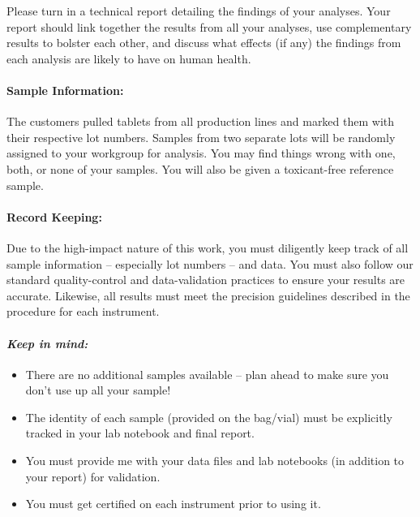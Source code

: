 \documentclass[]{tufte-book}
\providecommand{\tightlist}{%
  \setlength{\itemsep}{0pt}\setlength{\parskip}{0pt}}
\begin{document}
Please turn in a technical report detailing the findings of your analyses. Your report should link together the results from all your analyses, use complementary results to bolster each other, and discuss what effects (if any) the findings from each analysis are likely to have on human health.

\hypertarget{sample-information-1}{%
\paragraph{\texorpdfstring{\textbf{Sample Information:}}{Sample Information:}}\label{sample-information-1}}

The customers pulled tablets from all production lines and marked them with their respective lot numbers. Samples from two separate lots will be randomly assigned to your workgroup for analysis. You may find things wrong with one, both, or none of your samples. You will also be given a toxicant-free reference sample.

\hypertarget{record-keeping-1}{%
\paragraph{\texorpdfstring{\textbf{Record Keeping:}}{Record Keeping:}}\label{record-keeping-1}}

Due to the high-impact nature of this work, you must diligently keep track of all sample information -- especially lot numbers -- and data. You must also follow our standard quality-control and data-validation practices to ensure your results are accurate. Likewise, all results must meet the precision guidelines described in the procedure for each instrument.

\hypertarget{keep-in-mind-1}{%
\paragraph{\texorpdfstring{\emph{Keep in mind:}}{Keep in mind:}}\label{keep-in-mind-1}}

\begin{itemize}
\tightlist
\item
  There are no additional samples available -- plan ahead to make sure you don't use up all your sample!\\
\item
  The identity of each sample (provided on the bag/vial) must be explicitly tracked in your lab notebook and final report.\\
\item
  You must provide me with your data files and lab notebooks (in addition to your report) for validation.\\
\item
  You must get certified on each instrument prior to using it.
\end{itemize}
\end{document}
